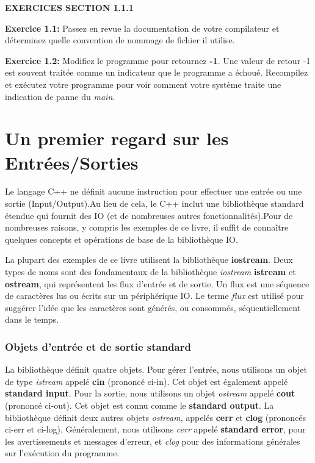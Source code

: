 \textbf{EXERCICES SECTION 1.1.1}
\begin{shadebox}
	
	\textbf{Exercice 1.1: }Passez en revue la documentation de votre compilateur et déterminez quelle convention de nommage de fichier il utilise.
	
	\textbf{Exercice 1.2: }Modifiez le programme pour retournez \textbf{-1}. Une valeur de retour -1 est souvent traitée comme un indicateur que le programme a échoué. Recompilez et exécutez votre programme pour voir comment votre système traite une indication de panne du \textit{main}.
\end{shadebox} 

\section{Un premier regard sur les Entrées/Sorties}

Le langage C++ ne définit aucune instruction pour effectuer une entrée ou une sortie (Input/Output).Au lieu de cela, le C++ inclut une bibliothèque standard étendue qui fournit des IO (et de nombreuses autres fonctionnalités).Pour de nombreuses raisons, y compris les exemples de ce livre, il suffit de connaître quelques concepts et opérations de base de la bibliothèque IO.

La plupart des exemples de ce livre utilisent la bibliothèque \textbf{iostream}. Deux types de noms sont des fondamentaux de la bibliothèque \textit{iostream} \textbf{istream} et \textbf{ostream}, qui représentent les flux d'entrée et de sortie. Un flux est une séquence de caractères lus ou écrits sur un périphérique IO. Le terme \textit{flux} est utilisé pour suggérer l'idée que les caractères sont générés, ou consommés, séquentiellement dans le temps.

\subsubsection{Objets d'entrée et de sortie standard}
La bibliothèque définit quatre objets. Pour gérer l'entrée, nous utilisons un objet de type \textit{istream} appelé \textbf{cin} (prononcé ci-in). Cet objet est également appelé \textbf{standard input}. Pour la sortie, nous utilisons un objet \textit{ostream} appelé \textbf{cout} (prononcé ci-out). Cet objet est connu comme le \textbf{standard output}. La bibliothèque définit deux autres objets \textit{ostream}, appelés \textbf{cerr} et \textbf{clog} (prononcés ci-err et ci-log). Généralement, nous utilisons \textit{cerr} appelé \textbf{standard error}, pour les avertissements et messages d'erreur, et \textit{clog} pour des informations générales sur l'exécution du programme.  

